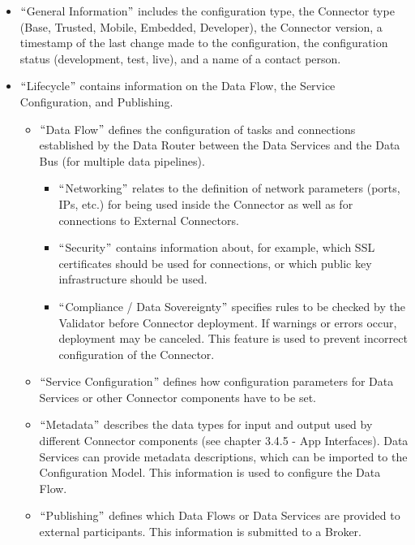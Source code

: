 \begin{itemize}
	\item $``$General Information$"$  includes the configuration type, the Connector type (Base, Trusted, Mobile, Embedded, Developer), the Connector version, a timestamp of the last change made to the configuration, the configuration status (development, test, live), and a name of a contact person.

	\item $``$Lifecycle$"$  contains information on the Data Flow, the Service Configuration, and Publishing.

	\begin{itemize}
		\item $``$Data Flow$"$  defines the configuration of tasks and connections established by the Data Router between the Data Services and the Data Bus (for multiple data pipelines).

		\begin{itemize}
			\item $``$Networking$"$  relates to the definition of network parameters (ports, IPs, etc.) for being used inside the Connector as well as for connections to External Connectors.

			\item $``$Security$"$  contains information about, for example, which SSL certificates should be used for connections, or which public key infrastructure should be used.

			\item $``$Compliance / Data Sovereignty$"$  specifies rules to be checked by the Validator before Connector deployment. If warnings or errors occur, deployment may be canceled. This feature is used to prevent incorrect configuration of the Connector.

		\end{itemize}

		\item $``$Service Configuration$"$  defines how configuration parameters for Data Services or other Connector components have to be set.

		\item $``$Metadata$"$  describes the data types for input and output used by different Connector components (see chapter 3.4.5 - App Interfaces). Data Services can provide metadata descriptions, which can be imported to the Configuration Model. This information is used to configure the Data Flow.

		\item $``$Publishing$"$  defines which Data Flows or Data Services are provided to external participants. This information is submitted to a Broker.


\end{itemize}
\end{itemize}

